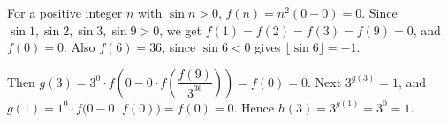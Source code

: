 For a positive integer $n$ with $\sin n>0$, $f(n)=n^2(0-0)=0$. Since $\sin1,\sin2,\sin3,\sin9>0$, we get $f(1)=f(2)=f(3)=f(9)=0$, and $f(0)=0$. Also $f(6)=36$, since $\sin6<0$ gives $\lfloor\sin6\rfloor=-1$.

Then $g(3)=3^0\cdot f\!\left(0-0\cdot f\!\left(\dfrac{f(9)}{3^{36}}\right)\right)=f(0)=0$. Next $3^{g(3)}=1$, and $g(1)=1^0\cdot f\bigl(0-0\cdot f(0)\bigr)=f(0)=0$. Hence $h(3)=3^{g(1)}=3^0=\boxed{1}$.
